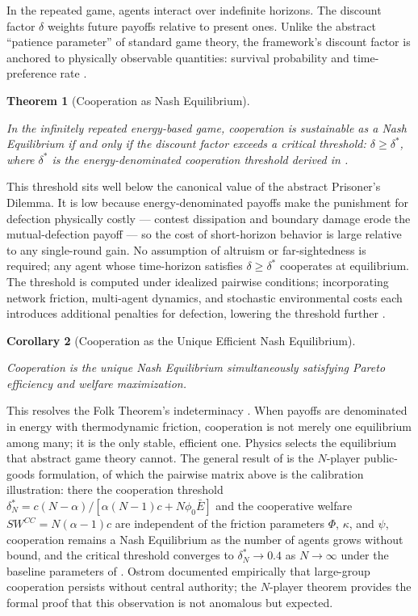 \documentclass[11pt]{article}
\theoremstyle{plain}
\newtheorem{theorem}{Theorem}
\newtheorem{corollary}[theorem]{Corollary}
\theoremstyle{definition}
\theoremstyle{remark}
\begin{document}
In the repeated game, agents interact over indefinite horizons. The
discount factor \(\delta\) weights future payoffs relative to present
ones. Unlike the abstract ``patience parameter'' of standard game
theory, the framework's discount factor is anchored to physically
observable quantities: survival probability and time-preference rate
\citep{TC-V}.

\begin{theorem}[Cooperation as Nash Equilibrium]
\label{ethics-thm-cooperation}

In the infinitely repeated energy-based game, cooperation is sustainable as a Nash Equilibrium if and only if the discount factor exceeds a critical threshold: $\delta \geq \delta^*$, where $\delta^*$ is the energy-denominated cooperation threshold derived in \citep{TC-V}.
\end{theorem}

This threshold sits well below the canonical value of the abstract
Prisoner's Dilemma. It is low because energy-denominated payoffs make
the punishment for defection physically costly --- contest dissipation
and boundary damage erode the mutual-defection payoff --- so the cost of
short-horizon behavior is large relative to any single-round gain. No
assumption of altruism or far-sightedness is required; any agent whose
time-horizon satisfies \(\delta \geq \delta^*\) cooperates at
equilibrium. The threshold is computed under idealized pairwise
conditions; incorporating network friction, multi-agent dynamics, and
stochastic environmental costs each introduces additional penalties for
defection, lowering the threshold further \citep{TC-V}.

\begin{corollary}[Cooperation as the Unique Efficient Nash Equilibrium]
\label{ethics-cor-unique-ne}

Cooperation is the unique Nash Equilibrium simultaneously satisfying Pareto efficiency and welfare maximization. \citep{TC-V}
\end{corollary}

This resolves the Folk Theorem's indeterminacy \citep{Fudenberg1986}.
When payoffs are denominated in energy with thermodynamic friction,
cooperation is not merely one equilibrium among many; it is the only
stable, efficient one. Physics selects the equilibrium that abstract
game theory cannot. The general result of \citep{TC-V} is the
\(N\)-player public-goods formulation, of which the pairwise matrix
above is the calibration illustration: there the cooperation threshold
\(\delta_N^* = c(N-\alpha)/[\alpha(N-1)c + N\phi_0\bar{E}]\) and the
cooperative welfare \(SW^{CC} = N(\alpha-1)c\) are independent of the
friction parameters \(\Phi\), \(\kappa\), and \(\psi\), cooperation
remains a Nash Equilibrium as the number of agents grows without bound,
and the critical threshold converges to \(\delta_N^* \to 0.4\) as
\(N \to \infty\) under the baseline parameters of \citep{TC-V}. Ostrom
\citep{Ostrom1990} documented empirically that large-group cooperation
persists without central authority; the \(N\)-player theorem provides
the formal proof that this observation is not anomalous but expected.
\end{document}
